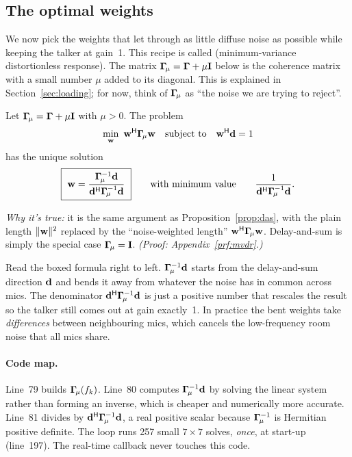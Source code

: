\documentclass[11pt]{article}
\begin{document}
\subsection{The optimal weights}

We now pick the weights that let through as little diffuse noise as possible while keeping the
talker at gain~1. This recipe is called  (minimum-variance distortionless
response). The matrix $\bm{\Gamma}_{\!\mu}=\bm{\Gamma}+\mu\mathbf{I}$ below is the coherence matrix with a small number $\mu$
added to its diagonal. This  is explained in
Section~\ref{sec:loading}; for now, think of $\bm{\Gamma}_{\!\mu}$ as ``the noise we are trying to reject''.

\begin{proposition}\label{prop:mvdr}
Let $\bm{\Gamma}_{\!\mu}=\bm{\Gamma}+\mu\mathbf{I}$ with $\mu>0$. The problem
\begin{equation}
  \min_{\vw}\ \vw\herm\Gmu\vw\quad\text{subject to}\quad \vw\herm\vd=1
\end{equation}
has the unique solution
\begin{equation}\label{eq:mvdr}
  \boxed{\ \mathbf{w}=\frac{\bm{\Gamma}_{\!\mu}^{-1}\mathbf{d}}{\mathbf{d}^{\mathsf H}\bm{\Gamma}_{\!\mu}^{-1}\mathbf{d}}\ }
  \qquad\text{with minimum value}\qquad \frac{1}{\mathbf{d}^{\mathsf H}\bm{\Gamma}_{\!\mu}^{-1}\mathbf{d}}.
\end{equation}
\end{proposition}
\noindent\emph{Why it's true:} it is the same argument as Proposition~\ref{prop:das}, with the
plain length $\|\mathbf{w}\|^2$ replaced by the ``noise-weighted length'' $\mathbf{w}^{\mathsf H}\bm{\Gamma}_{\!\mu}\mathbf{w}$.
Delay-and-sum is simply the special case $\bm{\Gamma}_{\!\mu}=\mathbf{I}$. \emph{(Proof: Appendix~\ref{prf:mvdr}.)}

\begin{inplainwords}
Read the boxed formula right to left. $\bm{\Gamma}_{\!\mu}^{-1}\mathbf{d}$ starts from the delay-and-sum direction $\mathbf{d}$
and bends it away from whatever the noise has in common across mics. The denominator
$\mathbf{d}^{\mathsf H}\bm{\Gamma}_{\!\mu}^{-1}\mathbf{d}$ is just a positive number that rescales the result so the talker still
comes out at gain exactly~1. In practice the bent weights take \emph{differences} between
neighbouring mics, which cancels the low-frequency room noise that all mics share.
\end{inplainwords}


\paragraph{Code map.} Line~79 builds $\bm{\Gamma}_{\!\mu}(f_k)$. Line~80 computes $\bm{\Gamma}_{\!\mu}^{-1}\mathbf{d}$ by solving the
linear system rather than forming an inverse, which is cheaper and numerically more accurate.
Line~81 divides by $\mathbf{d}^{\mathsf H}\bm{\Gamma}_{\!\mu}^{-1}\mathbf{d}$, a real positive scalar because $\bm{\Gamma}_{\!\mu}^{-1}$ is
Hermitian positive definite. The loop runs 257 small $7\times7$ solves, \emph{once}, at
start-up (line~197). The real-time callback never touches this code.
\end{document}
